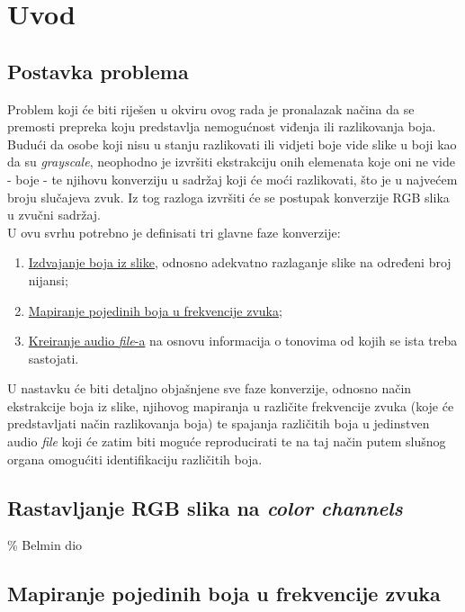 \documentclass[12pt,a4paper]{article}
\begin{document}
\section{Uvod}

\subsection{Postavka problema}

Problem koji će biti riješen u okviru ovog rada je pronalazak načina da se premosti prepreka koju predstavlja nemogućnost viđenja ili razlikovanja boja. Budući da osobe koji nisu u stanju razlikovati ili vidjeti boje vide slike u boji kao da su \textit{grayscale}, neophodno je izvršiti ekstrakciju onih elemenata koje oni ne vide - boje - te njihovu konverziju u sadržaj koji će moći razlikovati, što je u najvećem broju slučajeva zvuk. Iz tog razloga izvršiti će se postupak konverzije RGB slika u zvučni sadržaj. \\

U ovu svrhu potrebno je definisati tri glavne faze konverzije:

\begin{enumerate}

\item \underline{Izdvajanje boja iz slike}, odnosno adekvatno razlaganje slike na određeni broj nijansi;
\item \underline{Mapiranje pojedinih boja u frekvencije zvuka};
\item \underline{Kreiranje audio \textit{file}-a} na osnovu informacija o tonovima od kojih se ista treba sastojati.

\end{enumerate}

U nastavku će biti detaljno objašnjene sve faze konverzije, odnosno način ekstrakcije boja iz slike, njihovog mapiranja u različite frekvencije zvuka (koje će predstavljati način razlikovanja boja) te spajanja različitih boja u jedinstven audio \textit{file} koji će zatim biti moguće reproducirati te na taj način putem slušnog organa omogućiti identifikaciju različitih boja.

\subsection{Rastavljanje RGB slika na \textit{color channels}}

\% Belmin dio

\subsection{Mapiranje pojedinih boja u frekvencije zvuka}
\end{document}

